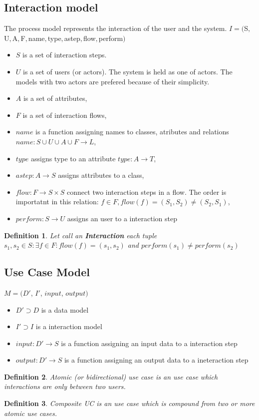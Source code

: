 \documentclass[10pt,a4paper]{article}
\newtheorem{mydef}{Definition}
\begin{document}
\subsection{Interaction model}
The process model represents the interaction of the user and the system.
$I=($S$, $U$, $A$, $F$, $name$, $type$, $astep$, $flow$, $perform$)$
\begin{itemize}
	\item $S$ is a set of interaction steps. 
	\item $U$ is a set of users (or actors). The system is held as one of actors. The models with two actors are prefered because of their simplicity. 
	\item $A$ is a set of attributes,
	\item $F$ is a set of interaction flows,
	\item $name$ is a function assigning names to classes, atributes and relations $name: S \cup U \cup A \cup F \rightarrow L$,
	\item $type$ assigns type to an attribute $type: A \rightarrow T$,
	\item $astep: A \rightarrow S$ assigns attributes to a class,
	\item $flow: F \rightarrow S \times S$ connect two interaction steps in a flow. The order is importatnt in this relation: $f \in F, flow(f)=(S_1, S_2)\neq(S_2, S_1)$,
	\item $perform: S \rightarrow U$ assigns an user to a interaction step 
\end{itemize}

\begin{mydef}
Let call an \textbf{Interaction} each tuple $s_1, s_2 \in S: \exists f \in F: flow(f)=(s_1,s_2) $ and  $perform(s_1) \neq perform(s_2)$ 
\end{mydef}



\subsection{Use Case Model}

$M = (D'$, $I'$, $input$, $output)$
\begin{itemize}
	\item $D' \supset D $ is a data model
	\item $I' \supset I$ is a interaction model
	\item $input: D' \rightarrow S$ is a function assigning an input data to a interaction step
	\item $output: D' \rightarrow S$ is a function assigning an output data to a ineteraction step
\end{itemize}

\begin{mydef}
Atomic (or bidirectional) use case is an use case which interactions are only between two users.
\end{mydef}


\begin{mydef}
Composite UC is an use case which is compound from two or more atomic use cases.
\end{mydef}
\end{document}
